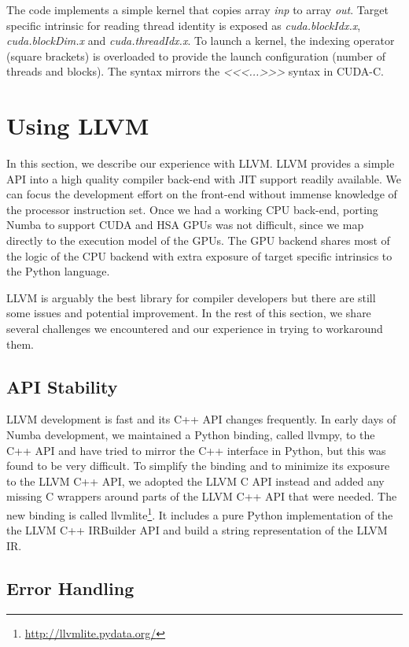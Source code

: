 \documentclass{sig-alternate}
\begin{document}
The code implements a simple kernel that copies array \textit{inp}
to array \textit{out}.  Target specific intrinsic for reading thread identity
is exposed as \textit{cuda.blockIdx.x}, \textit{cuda.blockDim.x} and
\textit{cuda.threadIdx.x}.  To launch a kernel, the indexing operator (square
brackets) is overloaded to provide the launch configuration (number of threads
and blocks).  The syntax mirrors the \textit{{<}{<}<...>{>}{>}} syntax
in CUDA-C.




\section{Using LLVM}

In this section, we describe our experience with LLVM.
LLVM provides a simple API into a high quality compiler back-end with
JIT support readily available. We can focus the development effort
on the front-end without immense knowledge of the processor instruction set.
Once we had a working CPU back-end, porting Numba to support CUDA and HSA GPUs
was not difficult, since we map directly to the execution model of the GPUs.
The GPU backend shares most of the logic of the CPU backend with extra
exposure of target specific intrinsics to the Python language.

LLVM is arguably the best library for compiler developers but there are still
some issues and potential improvement. In the rest of
this section, we share several challenges we encountered and our experience
in trying to workaround them.

\subsection{API Stability}

LLVM development is fast and its C++ API changes frequently.  In early
days of Numba development, we maintained a Python binding, called
llvmpy, to the C++ API and have tried to mirror the C++ interface in
Python, but this was found to be very difficult.  To simplify the
binding and to minimize its exposure to the LLVM C++ API, we adopted
the LLVM C API instead and added any missing C wrappers around parts
of the LLVM C++ API that were needed.  The new binding is called
llvmlite\footnote{\url{http://llvmlite.pydata.org/}}.  It includes a
pure Python implementation of the the LLVM C++ IRBuilder API and build
a string representation of the LLVM IR.

\subsection{Error Handling}
\end{document}
